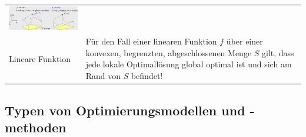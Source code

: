 \begin{tabularx}{\textwidth}{p{6cm} X}
      \includegraphics[width=8cm]{./Content/OptMathModels/ConvexBorderSolution}
      \\
    Lineare Funktion
      & Für den Fall einer linearen Funktion $f$ über einer konvexen, begrenzten, abgeschlossenen Menge $S$ gilt, dass jede lokale Optimallösung global optimal ist und sich am Rand von $S$ befindet!\\
  \end{tabularx}
  
\subsection{Typen von Optimierungsmodellen und -methoden }


